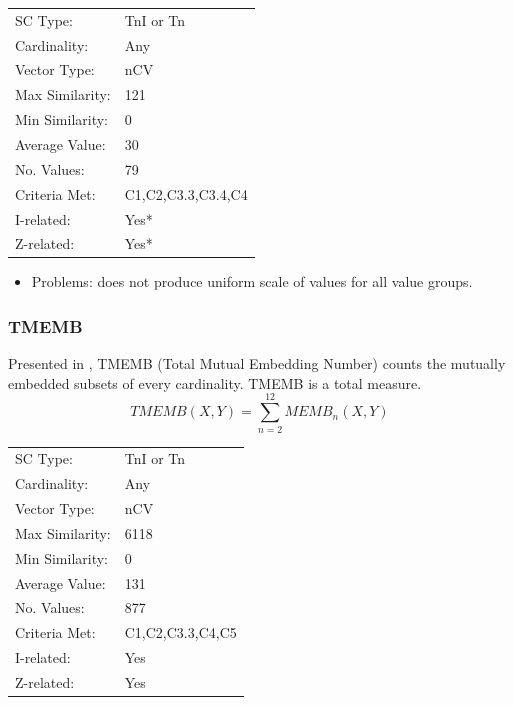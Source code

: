 \documentclass{article}
\begin{document}
\begin{center}
\begin{tabular}{ll}
 SC Type:         &  TnI or Tn           \\
 Cardinality:     &  Any                 \\
 Vector Type:     &  nCV                 \\
 Max Similarity:  &  121                 \\
 Min Similarity:  &  0                   \\
 Average Value:   &  30                  \\
 No. Values:      &  79                  \\
 Criteria Met:    &  C1,C2,C3.3,C3.4,C4  \\
 I-related:       &  Yes*                \\
 Z-related:       &  Yes*                \\
\end{tabular}
\end{center}


\begin{itemize}
\item Problems: does not produce uniform scale of values for all value
  groups.
\end{itemize}
\subsubsection{TMEMB}
\label{sec-15-5-3}

Presented in \citet[pp. 492]{Rahn1979}, TMEMB (Total Mutual Embedding
Number) counts the mutually embedded subsets of every
cardinality. TMEMB is a total measure.
$$TMEMB\left(X,Y\right)=\sum_{n=2}^{12}MEMB_{n}\left(X,Y\right)$$

\begin{center}
\begin{tabular}{ll}
 SC Type:         &  TnI or Tn         \\
 Cardinality:     &  Any               \\
 Vector Type:     &  nCV               \\
 Max Similarity:  &  6118              \\
 Min Similarity:  &  0                 \\
 Average Value:   &  131               \\
 No. Values:      &  877               \\
 Criteria Met:    &  C1,C2,C3.3,C4,C5  \\
 I-related:       &  Yes               \\
 Z-related:       &  Yes               \\
\end{tabular}
\end{center}
\end{document}
